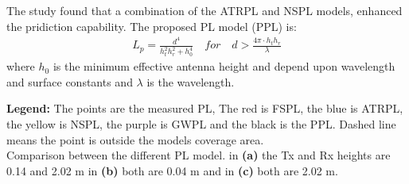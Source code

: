 \large

\begin{minipage}{.45\textwidth}
The study found that a combination of the ATRPL and NSPL models, enhanced the pridiction capability. The proposed PL model (PPL) is:
\vspace{-0.5em}\begin{align*}
L_p = \frac{d^4}{h_t^2 h_r^2+h_0^4}\quad for \quad d > \frac{4\pi\cdot h_th_r}{\lambda}
\end{align*}
where $h_0$ is the minimum effective antenna height and depend upon wavelength and surface constants and $\lambda$ is the wavelength.


\end{minipage}%
\hspace{1cm}
\begin{minipage}{0.45\textwidth}
\begin{center}

\end{center}
\end{minipage}

\vspace{0.5em}
\begin{minipage}{0.5\textwidth}
\begin{center}

\end{center}
\end{minipage}
\begin{minipage}{0.5\textwidth}
\begin{center}

\end{center}
\end{minipage}

\vspace{0.5em}
\textbf{Legend:} The points are the measured PL, The red is FSPL, the blue is ATRPL, the yellow is NSPL, the purple is GWPL and the black is the PPL. Dashed line means the point is outside the models coverage area.\\
Comparison between the different PL model. in \textbf{(a)} the Tx and Rx heights are 0.14 and 2.02 m in \textbf{(b)} both are 0.04 m and in \textbf{(c)} both are 2.02 m.
